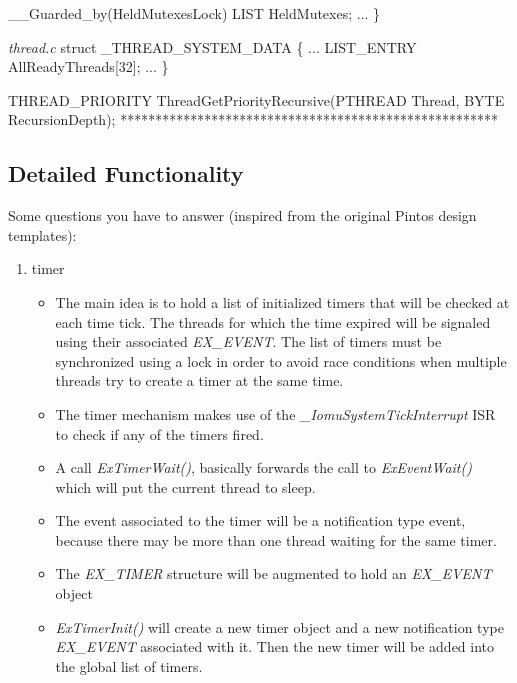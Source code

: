 	__Guarded_by(HeldMutexesLock)
	LIST HeldMutexes;
	...
\}

\textit{thread.c}
struct _THREAD_SYSTEM_DATA \{
	...
	LIST_ENTRY AllReadyThreads[32];
	...
\}

THREAD_PRIORITY ThreadGetPriorityRecursive(PTHREAD Thread, BYTE RecursionDepth);
******************************************************


\subsection{Detailed Functionality}

Some questions you have to answer (inspired from the original Pintos design templates):
\begin{enumerate}
    \item timer
        \begin{itemize}
            \item The main idea is to hold a list of initialized timers that will be checked at each time tick. The threads for which the time expired
            will be signaled using their associated \textit{EX_EVENT}. The list of timers must be synchronized using a lock in order to avoid race conditions
            when multiple threads try to create a timer at the same time.
            \item The timer mechanism makes use of the \textit{_IomuSystemTickInterrupt} ISR to check if any of the timers fired.
            \item A call \textit{ExTimerWait()}, basically forwards the call to \textit{ExEventWait()} which will put the current thread to sleep.
            \item The event associated to the timer will be a notification type event, because there may be more than one thread waiting for the same timer.

            \item The \textit{EX_TIMER} structure will be augmented to hold an \textit{EX_EVENT} object 
            \item \textit{ExTimerInit()} will create a new timer object and a new notification type \textit{EX_EVENT} associated with it. Then the new
            timer will be added into the global list of timers.
        \end{itemize}
    

\end{enumerate}
